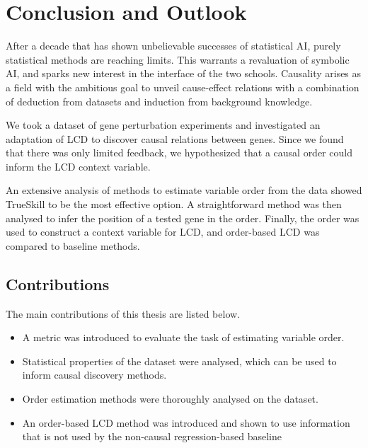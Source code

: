 \newpage
\section{Conclusion and Outlook}
\label{chapter:conclusion}




After a decade that has shown unbelievable successes of statistical AI, purely statistical methods are reaching limits. This warrants a revaluation of symbolic AI, and sparks new interest in the interface of the two schools. Causality arises as a field with the ambitious goal to unveil cause-effect relations with a combination of deduction from datasets and induction from background knowledge. 

We took a dataset of gene perturbation experiments and investigated an adaptation of LCD to discover causal relations between genes. Since we found that there was only limited feedback, we hypothesized that a causal order could inform the LCD context variable. 

An extensive analysis of methods to estimate variable order from the data showed TrueSkill to be the most effective option. A straightforward method was then analysed to infer the position of a tested gene in the order. Finally, the order was used to construct a context variable for LCD, and order-based LCD was compared to baseline methods.


\subsection{Contributions}
The main contributions of this thesis are listed below.

\begin{itemize}[noitemsep]
    \item A metric was introduced to evaluate the task of estimating variable order.
    \item Statistical properties of the \citet{kemmeren2014large} dataset were analysed, which can be used to inform causal discovery methods.
    \item Order estimation methods were thoroughly analysed on the \citet{kemmeren2014large} dataset.
    \item An order-based LCD method was introduced and shown to use information that is not used by the non-causal regression-based baseline
\end{itemize}


